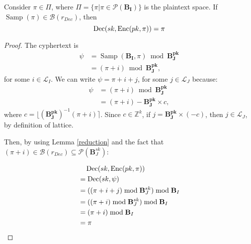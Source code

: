 \begin{theorem} 
\label{correctness_thm} Consider $\pi \in \Pi$, where $\Pi=\{\pi|\pi\in\mathcal{P}(\mathbf{ B_I})\}$ is the plaintext space. If $\operatorname{Samp}(\pi)\in\mathcal{B}(r_{Dec})$, then 
$$\operatorname{Dec}(sk,\operatorname{Enc}(pk,\pi))=\pi$$ 
\end{theorem}
\begin{proof}
The cyphertext is 
\begin{align*}
    \psi &= \operatorname{Samp}(\mathbf{B_I},\pi)\bmod \mathbf{B_J^{pk}}\\
    &= (\pi+i)\bmod \mathbf{B_J^{pk}},
\end{align*}
for some $i\in\mathcal{L}_I$. We can write $\psi=\pi+i+j$, for some $j\in\mathcal{L}_J$ because:
\begin{align*}
    \psi&=(\pi+i)\bmod \mathbf{B_J^{pk}}\\
    &=(\pi + i)-\mathbf{B_J^{pk}}\times c,
\end{align*}
where $c=\lfloor(\mathbf{B_J^{pk}})^{-1}(\pi+i)\rceil$. Since $c\in\mathbb{Z}^k$, if $j=\mathbf{B_J^{pk}}\times (-c)$, then $j\in\mathcal{L}_J$, by definition of lattice.

Then, by using Lemma \ref{reduction} and the fact that $(\pi+i)\in\mathcal{B}(r_{Dec})\subseteq\mathcal{P}(\mathbf{B}_J^{sk})$:

\begin{align*}
    &~~~\operatorname{Dec}(sk,\operatorname{Enc}(pk,\pi))\\&=\operatorname{Dec}(sk,\psi)\\
    &=((\pi+i+j)\bmod\mathbf{B}_J^{sk})\bmod\mathbf{B}_I\\
    &=((\pi+i)\bmod\mathbf{B}_J^{sk})\bmod\mathbf{B}_I\\
    &=(\pi+i)\bmod\mathbf{B}_I\\
    &=\pi
\end{align*}
\end{proof}



